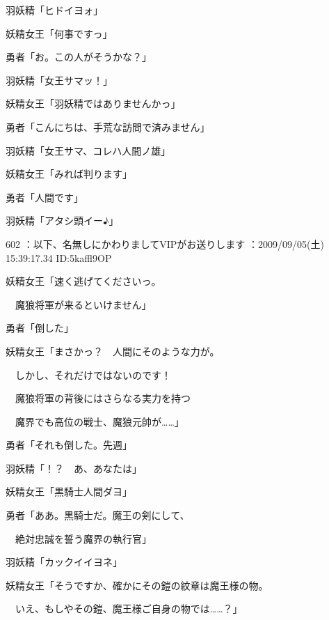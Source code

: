 \documentclass[a4j,twocolumn]{tarticle}
\begin{document}
羽妖精「ヒドイヨォ」 



妖精女王「何事ですっ」\par{} 
勇者「お。この人がそうかな？」 



羽妖精「女王サマッ！」 



妖精女王「羽妖精ではありませんかっ」\par{} 
勇者「こんにちは、手荒な訪問で済みません」 



羽妖精「女王サマ、コレハ人間ノ雄」\par{} 
妖精女王「みれば判ります」 



勇者「人間です」\par{} 
羽妖精「アタシ頭イー♪」 

	
    
    

602 ：以下、名無しにかわりましてVIPがお送りします ：2009/09/05(土) 15:39:17.34 ID:5kaffl9OP 


妖精女王「速く逃げてくださいっ。\par{} 
　魔狼将軍が来るといけません」 



勇者「倒した」 



妖精女王「まさかっ？　人間にそのような力が。\par{} 
　しかし、それだけではないのです！\par{} 
　魔狼将軍の背後にはさらなる実力を持つ\par{} 
　魔界でも高位の戦士、魔狼元帥が……」 



勇者「それも倒した。先週」 



羽妖精「！？　あ、あなたは」\par{} 
妖精女王「黒騎士人間ダヨ」 



勇者「ああ。黒騎士だ。魔王の剣にして、\par{} 
　絶対忠誠を誓う魔界の執行官」 



羽妖精「カックイイヨネ」\par{} 
妖精女王「そうですか、確かにその鎧の紋章は魔王様の物。\par{} 
　いえ、もしやその鎧、魔王様ご自身の物では……？」 
\end{document}
